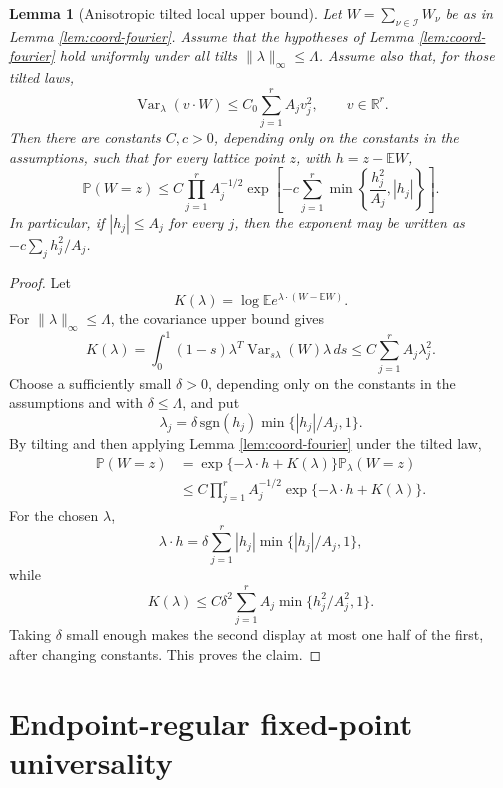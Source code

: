 \documentclass[11pt]{article}
\newtheorem{lemma}[theorem]{Lemma}
\theoremstyle{remark}
\newcommand{\Pp}{\mathbb P}
\newcommand{\Ee}{\mathbb E}
\newcommand{\Rr}{\mathbb R}
\newcommand{\Var}{\operatorname{Var}}
\newcommand{\dd}{\,d}
\begin{document}
\begin{lemma}[Anisotropic tilted local upper bound]\label{lem:anisotropic-tilted-upper}
Let \(W=\sum_{\nu\in\mathcal I}W_\nu\) be as in Lemma \ref{lem:coord-fourier}.  Assume that the hypotheses of Lemma \ref{lem:coord-fourier} hold uniformly under all tilts \(\|\lambda\|_\infty\le\Lambda\).  Assume also that, for those tilted laws,
\[
        \Var_\lambda(v\cdot W)
        \le C_0\sum_{j=1}^r A_jv_j^2,
        \qquad v\in\Rr^r .
\]
Then there are constants \(C,c>0\), depending only on the constants in the assumptions, such that for every lattice point \(z\), with
\(h=z-\Ee W\),
\[
        \Pp(W=z)
        \le C\prod_{j=1}^r A_j^{-1/2}
        \exp\left[-c\sum_{j=1}^r
        \min\left\{\frac{h_j^2}{A_j}, |h_j|\right\}\right].
\]
In particular, if \(|h_j|\le A_j\) for every \(j\), then the exponent may be written as
\(-c\sum_j h_j^2/A_j\).
\end{lemma}

\begin{proof}
Let
\[
        K(\lambda)=\log\Ee e^{\lambda\cdot(W-\Ee W)}.
\]
For \(\|\lambda\|_\infty\le\Lambda\), the covariance upper bound gives
\[
        K(\lambda)
        =\int_0^1(1-s)\lambda^T
        \Var_{s\lambda}(W)\lambda\dd s
        \le C\sum_{j=1}^r A_j\lambda_j^2 .
\]
Choose a sufficiently small \(\delta>0\), depending only on the constants in the assumptions and with \(\delta\le\Lambda\), and put
\[
        \lambda_j=\delta\,\mathrm{sgn}(h_j)
        \min\{|h_j|/A_j,1\}.
\]
By tilting and then applying Lemma \ref{lem:coord-fourier} under the tilted law,
\[
\begin{aligned}
        \Pp(W=z)
        &=\exp\{-\lambda\cdot h+K(\lambda)\}
          \Pp_\lambda(W=z) \\
        &\le C\prod_{j=1}^r A_j^{-1/2}
        \exp\{-\lambda\cdot h+K(\lambda)\}.
\end{aligned}
\]
For the chosen \(\lambda\),
\[
        \lambda\cdot h
        =\delta\sum_{j=1}^r |h_j|\min\{|h_j|/A_j,1\},
\]
while
\[
        K(\lambda)
        \le C\delta^2\sum_{j=1}^r
        A_j\min\{h_j^2/A_j^2,1\}.
\]
Taking \(\delta\) small enough makes the second display at most one half of the first, after changing constants.  This proves the claim.
\end{proof}

\section{Endpoint-regular fixed-point universality}\label{sec:endpoint-fixed-universality}
\end{document}
